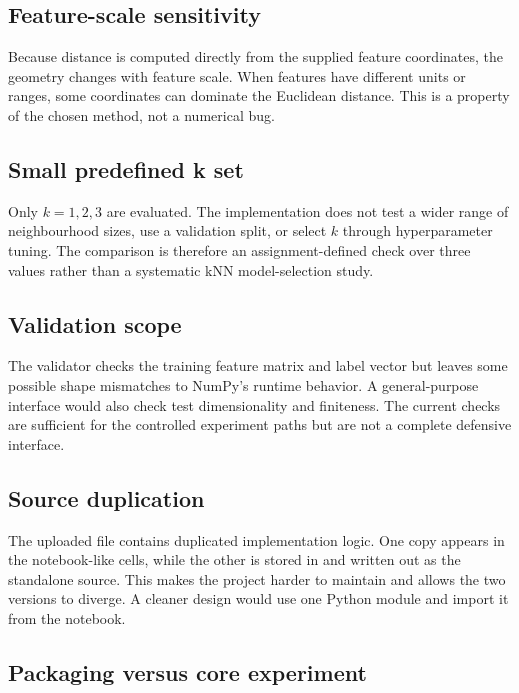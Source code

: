 \documentclass[11pt,a4paper]{article}
\newcommand{\code}[1]{\texttt{\detokenize{#1}}}
\begin{document}
\subsection{Feature-scale sensitivity}

Because distance is computed directly from the supplied feature coordinates, the geometry changes with feature scale. When features have different units or ranges, some coordinates can dominate the Euclidean distance. This is a property of the chosen method, not a numerical bug.

\subsection{Small predefined k set}

Only $k=1,2,3$ are evaluated. The implementation does not test a wider range of neighbourhood sizes, use a validation split, or select $k$ through hyperparameter tuning. The comparison is therefore an assignment-defined check over three values rather than a systematic kNN model-selection study.

\subsection{Validation scope}

The validator checks the training feature matrix and label vector but leaves some possible shape mismatches to NumPy's runtime behavior. A general-purpose interface would also check test dimensionality and finiteness. The current checks are sufficient for the controlled experiment paths but are not a complete defensive interface.

\subsection{Source duplication}

The uploaded file contains duplicated implementation logic. One copy appears in the notebook-like cells, while the other is stored in \code{script_text} and written out as the standalone source. This makes the project harder to maintain and allows the two versions to diverge. A cleaner design would use one Python module and import it from the notebook.

\subsection{Packaging versus core experiment}
\end{document}
